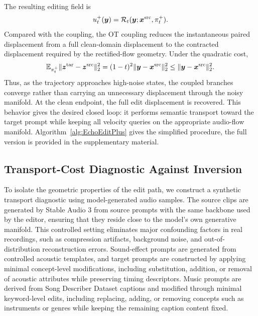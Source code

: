 The resulting \methodplus editing field is
\begin{equation}
    \label{eq:audioeditplus_field}
    u_t^{+}(\boldsymbol{y})
    =
    \mathcal{R}_t(\boldsymbol{y};\boldsymbol{x}^{\mathrm{src}},\pi_t^{+}).
\end{equation}
Compared with the \method coupling, the OT coupling reduces the instantaneous paired displacement from a full clean-domain displacement to the contracted displacement required by the rectified-flow geometry.
Under the quadratic cost,
\begin{equation}
    \label{eq:ot_contraction}
    \mathbb{E}_{\pi_t^{+}}\|\boldsymbol{z}^{\mathrm{tar}}-\boldsymbol{z}^{\mathrm{src}}\|_2^2
    =
    (1-t)^2\|\boldsymbol{y}-\boldsymbol{x}^{\mathrm{src}}\|_2^2
    \le
    \|\boldsymbol{y}-\boldsymbol{x}^{\mathrm{src}}\|_2^2.
\end{equation}
Thus, as the trajectory approaches high-noise states, the coupled branches converge rather than carrying an unnecessary displacement through the noisy manifold.
At the clean endpoint, the full edit displacement is recovered.
This behavior gives \methodplus the desired closed loop: it performs semantic transport toward the target prompt while keeping all velocity queries on the appropriate audio-flow manifold.
Algorithm~\ref{alg:EchoEditPlus} gives the simplified procedure, the full version is provided in the supplementary material.

\subsection{Transport-Cost Diagnostic Against Inversion}
\label{sec:exact_inversion_audio}

To isolate the geometric properties of the edit path, we construct a synthetic transport diagnostic using model-generated audio samples.
The source clips are generated by Stable Audio 3 from source prompts with the same backbone used by the editor, ensuring that they reside close to the model's own generative manifold.
This controlled setting eliminates major confounding factors in real recordings, such as compression artifacts, background noise, and out-of-distribution reconstruction errors.
Sound-effect prompts are generated from controlled acoustic templates, and target prompts are constructed by applying minimal concept-level modifications, including substitution, addition, or removal of acoustic attributes while preserving timing descriptors.
Music prompts are derived from Song Describer Dataset captions and modified through minimal keyword-level edits, including replacing, adding, or removing concepts such as instruments or genres while keeping the remaining caption content fixed.

